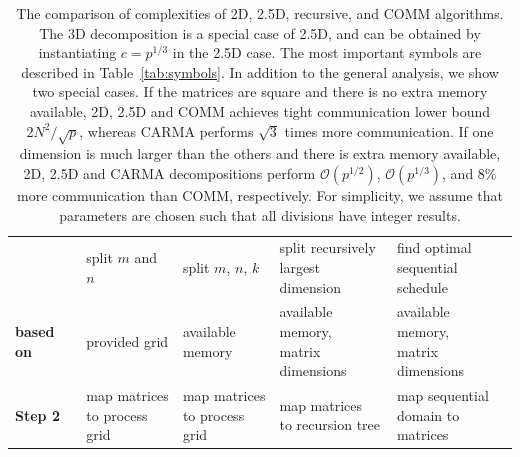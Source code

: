 \documentclass[sigplan,review,anonymous,10pt]{acmart}\settopmatter{printfolios=true,printccs=false,printacmref=false}
\begin{document}
\begin{table}
\begin{tabular}{lllll}
		&
		split $m$ and $n$
		&
		split $m$, $n$, $k$
		& 
		\makecell[l] {
			split recursively\\ largest dimension
		}
		& 
		\makecell[l] {
			find optimal\\
			sequential schedule
		}
		\\
		\textbf{based on}
		&
		provided grid
		&
		\makecell[l] {
			available\\
			memory
		}
		&
		\makecell[l] {
			available memory, \\
			matrix dimensions}
		& 
		\makecell[l] {
			available memory, \\
			matrix dimensions}
		\\
		\midrule
		\textbf{Step 2}
		&
		\makecell[l] {
			map matrices \\
			to process grid
		}
		&
		\makecell[l] {
			map matrices \\
			to process grid
		}
		&
		\makecell[l] {
			map matrices \\
			to recursion tree
		}
		& 
		\makecell[l] {
			map sequential \\
			domain to matrices
		}
		\\
		\bottomrule
	\end{tabular}
	\caption{The comparison of complexities of 2D, 2.5D, recursive, and COMM 
		algorithms. The 3D decomposition is a special case of 2.5D, and can be 
		obtained 
		by
		instantiating $c=p^{1/3}$ in the 2.5D case.
		The most important symbols are described in Table~\ref{tab:symbols}. In 
		addition to the general analysis, we show two special cases. If the 
		matrices 
		are 
		square and there is no extra memory available, 2D, 2.5D and COMM 
		achieves tight 
		communication lower bound $2N^2/\sqrt{p}$, whereas CARMA performs 
		$\sqrt{3}$ 
		times more 
		communication. If one dimension is much larger than the others and 
		there is 
		extra memory available, 2D, 2.5D and CARMA decompositions perform 
		$\mathcal{O}(p^{1/2})$, $\mathcal{O}(p^{1/3})$, and 8\%  more 
		communication 
		than COMM, respectively. For simplicity, we assume that
		parameters are chosen such that all divisions have integer results.
	}
	\vspace{-2em}
	\label{tab:intro}
\end{table}
\end{document}

